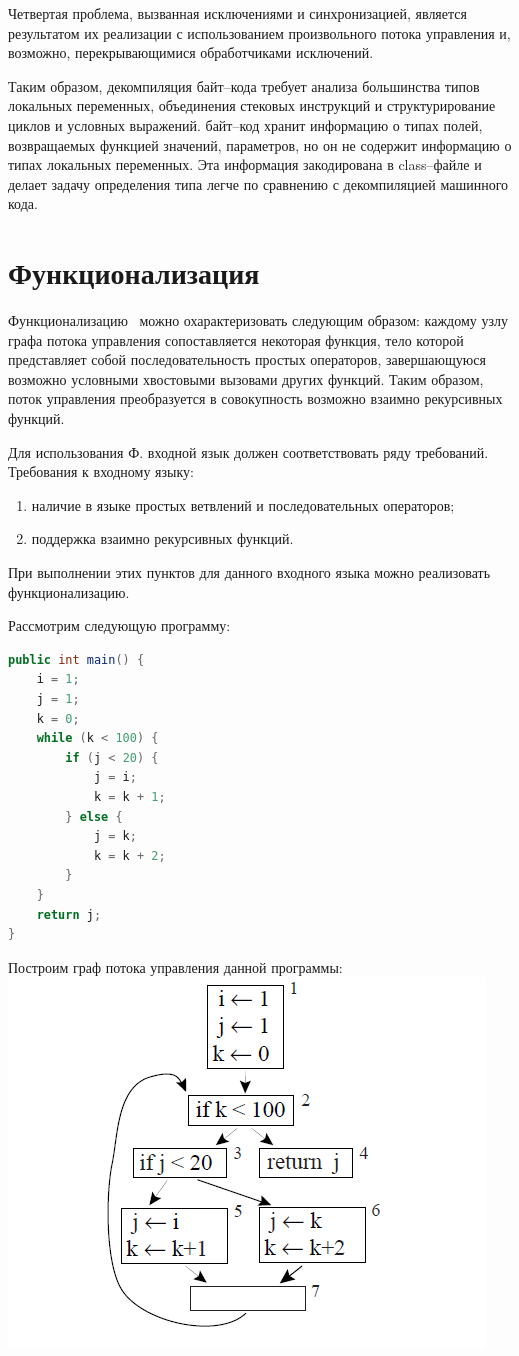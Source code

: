 Четвертая проблема, вызванная исключениями и синхронизацией, является результатом их реализации с использованием произвольного потока управления и, возможно, перекрывающимися обработчиками исключений.

Таким образом, декомпиляция байт--кода требует анализа большинства типов локальных переменных, объединения стековых инструкций  и структурирование циклов и условных выражений. байт--код хранит информацию о типах полей, возвращаемых функцией значений, параметров, но он не содержит информацию о типах локальных переменных. Эта информация закодирована в class--файле и делает задачу определения типа легче по сравнению с декомпиляцией машинного кода.

\section{Функционализация}
\label{functionalization}

Функционализацию~\cite{ssa} можно охарактеризовать следующим образом: каждому узлу графа потока управления сопоставляется некоторая функция, тело которой представляет собой последовательность простых операторов, завершающуюся возможно условными хвостовыми вызовами других функций. Таким образом, поток управления преобразуется в совокупность возможно взаимно рекурсивных функций. 

Для использования Ф. входной язык должен соответствовать ряду требований.
Требования к входному языку:
\begin{enumerate}
\item наличие в языке простых ветвлений и последовательных операторов;
\item поддержка взаимно рекурсивных функций.
\end{enumerate}

При выполнении этих пунктов для данного входного языка можно реализовать функционализацию. 

Рассмотрим следующую программу:

\begin{lstlisting}[language = Java]
public int main() {
	i = 1;
	j = 1;
	k = 0;
	while (k < 100) {
		if (j < 20) {
			j = i;
			k = k + 1;
		} else {
			j = k;
			k = k + 2;
		}
	}
	return j;
}
\end{lstlisting}

Построим граф потока управления данной программы: \\
\includegraphics[width=0.7\linewidth]{Zabransky/cfgappel.png}

